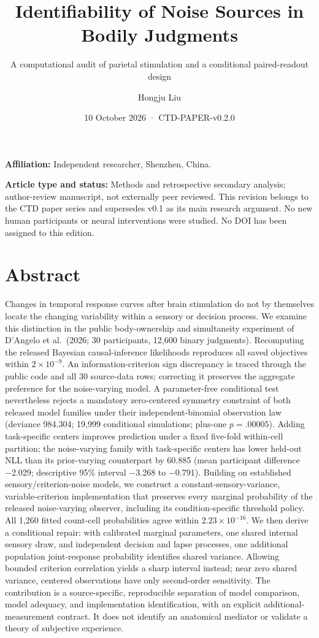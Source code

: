 \documentclass[
  11pt,
]{article}
\title{Identifiability of Noise Sources in Bodily Judgments}
\subtitle{A computational audit of parietal stimulation and a
conditional paired-readout design}
\author{Hongju Liu}
\date{10 October 2026 · CTD-PAPER-v0.2.0}
\let\ctdoldsection\section
\renewcommand{\section}{\Needspace{8\baselineskip}\ctdoldsection}
\begin{document}
\maketitle

\textbf{Affiliation:} Independent researcher, Shenzhen, China.

\textbf{Article type and status:} Methods and retrospective secondary
analysis; author-review manuscript, not externally peer reviewed. This
revision belongs to the CTD paper series and supersedes v0.1 as its main
research argument. No new human participants or neural interventions
were studied. No DOI has been assigned to this edition.

\hypertarget{abstract}{%
\section{Abstract}\label{abstract}}

Changes in temporal response curves after brain stimulation do not by
themselves locate the changing variability within a sensory or decision
process. We examine this distinction in the public body-ownership and
simultaneity experiment of D'Angelo et al.~(2026; 30 participants,
12,600 binary judgments). Recomputing the released Bayesian
causal-inference likelihoods reproduces all saved objectives within
\(2\times10^{-9}\). An information-criterion sign discrepancy is traced
through the public code and all 30 source-data rows; correcting it
preserves the aggregate preference for the noise-varying model. A
parameter-free conditional test nevertheless rejects a mandatory
zero-centered symmetry constraint of both released model families under
their independent-binomial observation law (deviance 984.304; 19,999
conditional simulations; plus-one \(p=.00005\)). Adding task-specific
centers improves prediction under a fixed five-fold within-cell
partition; the noise-varying family with task-specific centers has lower
held-out NLL than its prior-varying counterpart by 60.885 (mean
participant difference −2.029; descriptive 95\% interval −3.268 to
−0.791). Building on established sensory/criterion-noise models, we
construct a constant-sensory-variance, variable-criterion implementation
that preserves every marginal probability of the released noise-varying
observer, including its condition-specific threshold policy. All 1,260
fitted count-cell probabilities agree within \(2.23\times10^{-16}\). We
then derive a conditional repair: with calibrated marginal parameters,
one shared internal sensory draw, and independent decision and lapse
processes, one additional population joint-response probability
identifies shared variance. Allowing bounded criterion correlation
yields a sharp interval instead; near zero shared variance, centered
observations have only second-order sensitivity. The contribution is a
source-specific, reproducible separation of model comparison, model
adequacy, and implementation identification, with an explicit
additional-measurement contract. It does not identify an anatomical
mediator or validate a theory of subjective experience.
\end{document}
